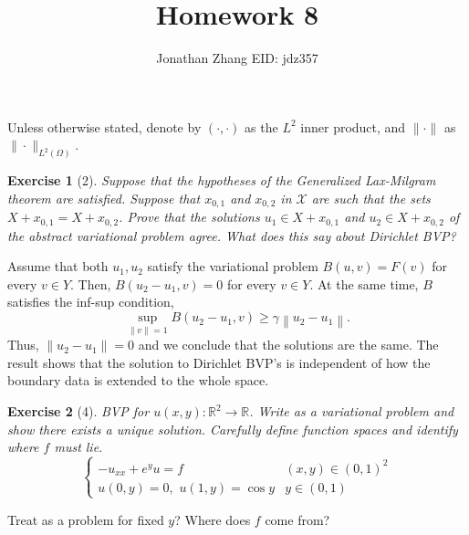 \documentclass[letterpaper,twoside,11pt]{article}
\theoremstyle{mystyle}
\newtheorem*{exercise}{Exercise}
\newcommand{\R}{{\mathbb R}}
\newcommand{\cbk}{\color{black}}
\newcommand{\cred}{\color{red}}
\begin{document}
\title{\vspace{-2\baselineskip} 
Homework 8
}
\author{Jonathan Zhang \qquad EID: { jdz357} }
\date{}
\maketitle

Unless otherwise stated, denote by $\left( \cdot, \cdot \right)$ as the $L^2$ inner product, and $\|\cdot\|$ as $\|\cdot \|_{L^2\left( \Omega \right)}$. 

\begin{exercise}[2]
  Suppose that the hypotheses of the Generalized Lax-Milgram theorem are satisfied. Suppose that $x_{0,1}$ and $x_{0,2}$ in $\mathcal X$ are such that the sets $X + x_{0,1} = X + x_{0,2}$. Prove that the solutions $u_1 \in X + x_{0,1}$ and $u_2 \in X + x_{0,2}$ of the abstract variational problem agree. What does this say about Dirichlet BVP? 
\end{exercise}

Assume that both $u_1, u_2$ satisfy the variational problem $B(u, v) = F(v)$ for every $v \in Y$. Then, $B(u_2 - u_1 , v) = 0$ for every $v \in Y$. At the same time, $B$ satisfies the inf-sup condition, 
\[\mathop {\sup }\limits_{\left\| v \right\| = 1} B\left( {{u_2} - {u_1},v} \right) \geqslant \gamma \left\| {{u_2} - {u_1}} \right\|.\]
Thus, $\|u_2-u_1\| = 0$ and we conclude that the solutions are the same. 
The result shows that the solution to Dirichlet BVP's is independent of how the boundary data is extended to the whole space. 

\begin{exercise}[4]
BVP for $u (x,y) : \R^2 \to \R$. Write as a variational problem and show there exists a unique solution. Carefully define function spaces and identify where $f$ must lie. 
\[\left\{ {\begin{array}{*{20}{c}}
  { - {u_{xx}} + {e^y}u = f}&{\left( {x,y} \right) \in {{\left( {0,1} \right)}^2}} \\[.2cm] 
  {u\left( {0,y} \right) = 0,\,\,u\left( {1,y} \right) = \cos y}&{y \in \left( {0,1} \right)} 
\end{array}} \right.\]
\end{exercise}

\cred Treat as a problem for fixed $y$? Where does $f$ come from? \cbk 
\end{document}
